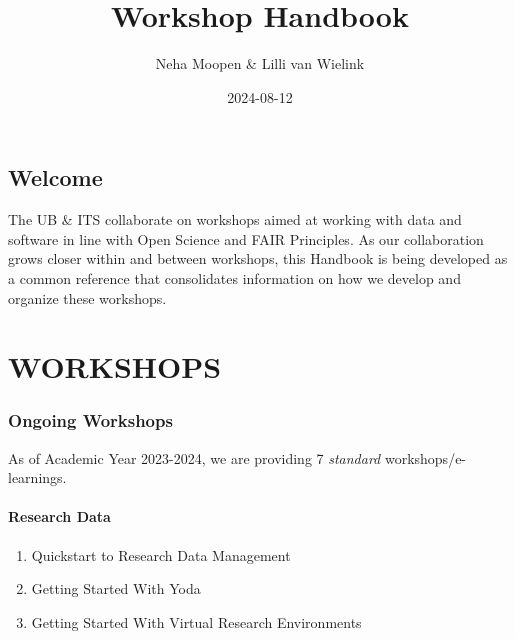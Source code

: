 \documentclass[
  letterpaper,
  DIV=11,
  numbers=noendperiod]{scrreprt}
\title{Workshop Handbook}
\author{Neha Moopen \& Lilli van Wielink}
\date{2024-08-12}
\renewcommand*\contentsname{Table of contents}
\newcommand\contentsname{Table of contents}
\begin{document}
\maketitle

\renewcommand*\contentsname{Table of contents}
{
\hypersetup{linkcolor=}
\setcounter{tocdepth}{2}
\tableofcontents
}


\chapter*{Welcome}\label{welcome}


The UB \& ITS collaborate on workshops aimed at working with data and
software in line with Open Science and FAIR Principles. As our
collaboration grows closer within and between workshops, this Handbook
is being developed as a common reference that consolidates information
on how we develop and organize these workshops.

\part{WORKSHOPS}

\section*{Ongoing Workshops}\label{ongoing-workshops}


As of Academic Year 2023-2024, we are providing 7 \emph{standard}
workshops/e-learnings.

\subsection*{Research Data}\label{research-data}

\begin{enumerate}
\def\labelenumi{\arabic{enumi}.}
\item
  Quickstart to Research Data Management
\item
  Getting Started With Yoda
\item
  Getting Started With Virtual Research Environments
\end{enumerate}
\end{document}
